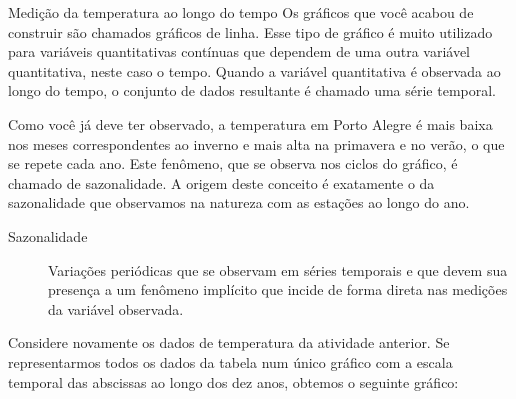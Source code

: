 {{\begin{task}{Medição da temperatura ao longo do tempo}
Os gráficos que você acabou de construir são chamados gráficos de linha. Esse tipo de gráfico é muito utilizado para variáveis quantitativas contínuas que dependem de uma outra variável quantitativa, neste caso o tempo. Quando a variável quantitativa é observada ao longo do tempo, o conjunto de dados resultante é chamado uma série temporal.

\end{task}

\begin{observation}{}

Como você já deve ter observado, a temperatura em Porto Alegre é mais baixa nos meses correspondentes ao inverno e mais alta na primavera e no verão, o que se repete cada ano. Este fenômeno, que se observa nos ciclos do gráfico, é chamado de sazonalidade. A origem deste conceito é exatamente o da sazonalidade que observamos na natureza com as estações ao longo do ano.
\end{observation}
\begin{description}
\item[{Sazonalidade}] \leavevmode{}\label{est1-def-13}
Variações periódicas que se observam em séries temporais e que devem sua presença a um fenômeno implícito que incide de forma direta nas medições da variável observada.

\end{description}

Considere novamente os dados de temperatura da atividade anterior. Se representarmos todos os dados da tabela num único gráfico com a escala temporal das abscissas ao longo dos dez anos, obtemos o seguinte gráfico:

\begin{figure}[H]
\centering
\capstart

\end{figure}}}
